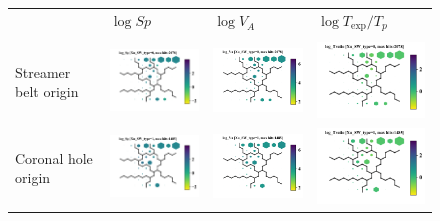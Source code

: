 \documentclass[utf8]{frontiersSCNS} %
\begin{document}
\begin{figure}[h!]\centering
	\begin{tabular}{m{2.5cm}CCC}
		& $\log Sp$ & $\log V_{A}$ & $\log T_{\text{exp}}/T_p$ \\ \\
		Streamer belt origin & \includegraphics[width=4.5cm]{Amaya/SWtype-Xu_SW_type-0-log_Sp} &
		\includegraphics[width=4.5cm]{Amaya/SWtype-Xu_SW_type-0-log_Va} &
		\includegraphics[width=4.5cm]{Amaya/SWtype-Xu_SW_type-0-log_Tratio} \hfill	\\
		
		Coronal hole origin & \includegraphics[width=4.5cm]{Amaya/SWtype-Xu_SW_type-1-log_Sp} &
		\includegraphics[width=4.5cm]{Amaya/SWtype-Xu_SW_type-1-log_Va} &
		\includegraphics[width=4.5cm]{Amaya/SWtype-Xu_SW_type-1-log_Tratio} \hfill	\\
		

\end{tabular}
\end{figure}
\end{document}
